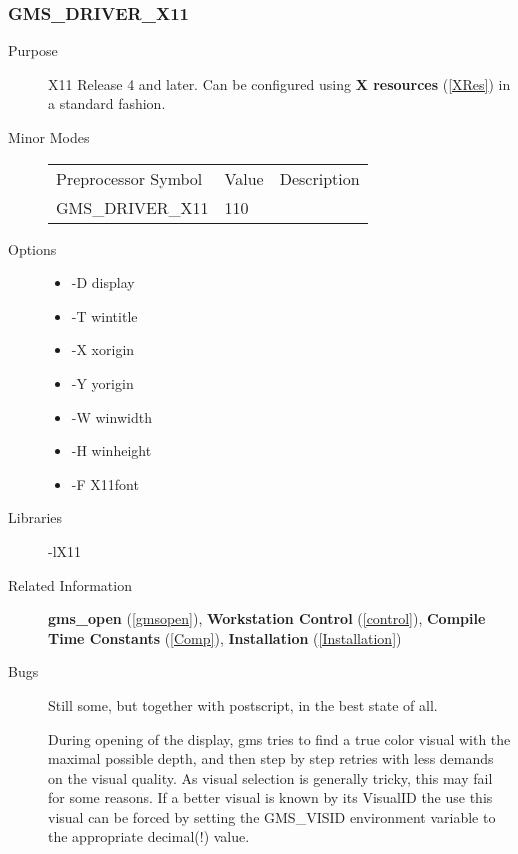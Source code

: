 \subsubsection{GMS\_DRIVER\_X11\label{x11}}
\begin{description}
\item[Purpose]\mbox{}


X11 Release 4 and later. Can be configured using 
{\bf X resources} (\ref{XRes}) in a standard fashion.


\item[Minor Modes]\mbox{}


\begin{center}
\begin{tabular}{lll}\hline
Preprocessor Symbol & Value& Description\\ 
GMS\_DRIVER\_X11 &  110& \\ 
\hline\end{tabular}
\end{center}

\item[Options]\mbox{}


\begin{itemize}
\item  -D display 
\item  -T wintitle 
\item  -X xorigin 
\item  -Y yorigin 
\item  -W winwidth   
\item  -H winheight 
\item  -F X11font 
\end{itemize}

\item[Libraries]\mbox{}


-lX11
\item[Related Information]\mbox{}


{\bf gms\_open} (\ref{gmsopen}), 
{\bf Workstation Control} (\ref{control}), 
{\bf Compile Time Constants} (\ref{Comp}), 
{\bf Installation} (\ref{Installation}) 
\item[Bugs]\mbox{}


Still some, but together with postscript, in the best state of all.

During opening of the display, gms  tries to find  a true color visual
with the  maximal possible depth, and then  step  by step retries with
less demands on the visual quality.   As visual selection is generally
tricky, this may fail for some reasons.  If a better visual is known 
by its VisualID the use this visual can be forced by setting the
GMS\_VISID environment variable to the appropriate decimal(!) value.


\end{description}
